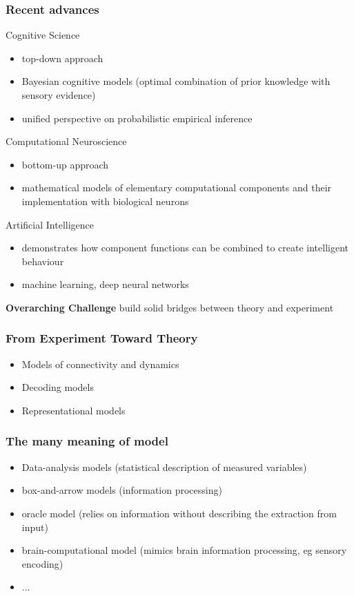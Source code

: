 \documentclass[
t, %
10pt, %
aspectratio=1610, %
ngerman,
english,
]{beamer}
\begin{document}
\begin{frame}
    \frametitle{Recent advances}
    Cognitive Science
    \begin{itemize}
     \item top-down approach
     \item Bayesian cognitive models (optimal combination of prior knowledge with sensory evidence)
     \item unified perspective on probabilistic empirical inference
    \end{itemize}
    Computational Neuroscience
    \begin{itemize}
     \item bottom-up approach
     \item mathematical models of elementary computational components and their implementation with biological neurons
    \end{itemize}
    Artificial Intelligence
    \begin{itemize}
     \item demonstrates how component functions can be combined to create intelligent behaviour
     \item machine learning, deep neural networks
    \end{itemize}
    
    \textbf{Overarching Challenge}
    build solid bridges between theory and experiment
\end{frame}

\begin{frame}
    \frametitle{From Experiment Toward Theory}
    \begin{itemize}
     \item Models of connectivity and dynamics
     \item Decoding models
     \item Representational models
    \end{itemize}
\end{frame}

\begin{frame}
    \frametitle{The many meaning of model}
    \begin{itemize}
     \item Data-analysis models (statistical description of measured variables)
     \item box-and-arrow models (information processing)
     \item oracle model (relies on information without describing the extraction from input)
     \item brain-computational model (mimics brain information processing, eg sensory encoding)
     \item ...
    \end{itemize}

\end{frame}
\end{document}

